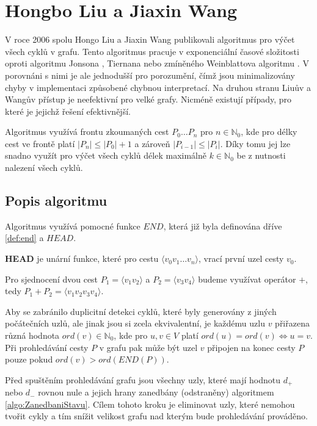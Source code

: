 \chapter{Hongbo Liu a Jiaxin Wang}
    \label{chapter:Algo3}
    V roce 2006 spolu Hongo Liu a Jiaxin Wang publikovali algoritmus \cite{A_new_way_to_enumerate_cycles_in_graph} pro výčet všech cyklů v grafu. Tento algoritmus pracuje v exponenciální časové složitosti oproti algoritmu Jonsona \cite{Johnson_1975}, Tiernana \cite{Tiernan} nebo zmíněného Weinblattova algoritmu \cite{A_new_search_algorithm}. V porovnáni s nimi je ale jednodušší pro porozumění, čímž jsou minimalizovány chyby v implementaci způsobené chybnou interpretací. Na druhou stranu Liuův a Wangův přístup je neefektivní pro velké grafy. Nicméně existují případy, pro které je jejichž řešení efektivnější.

    Algoritmus využívá frontu zkoumaných cest $P_0 \dots P_n$ pro $n \in \mathbb{N}_0$, kde pro délky cest ve frontě platí $|P_n| \leq |P_0| + 1$ a zároveň $|P_{i-1}| \leq |P_{i}|$. Díky tomu jej lze snadno využít pro výčet všech cyklů délek maximálně $k \in \mathbb{N}_0$ be z nutnosti nalezení všech cyklů.

    \section{Popis algoritmu}
        Algoritmus využívá pomocné funkce $\mathit{END}$, která již byla definována dříve \ref{def:end} a $\mathit{HEAD}$.

        \begin{definition}
            \textbf{HEAD} je unární funkce, které pro cestu $\langle v_0 v_1 \dots v_n \rangle$, vrací první uzel cesty $v_0$.\\
        \end{definition}

        Pro sjednocení dvou cest $P_1 = \langle v_1v_2 \rangle$ a $P_2 = \langle v_3v_4 \rangle$ budeme využívat operátor $+$, tedy $P_1 + P_2 = \langle v_1v_2v_3v_4 \rangle$.

        Aby se zabránilo duplicitní detekci cyklů, které byly generovány z jiných počátečních uzlů, ale jinak jsou si zcela ekvivalentní, je každému uzlu $v$ přiřazena různá hodnota $ord(v) \in \mathbb{N}_0$, kde pro $u, v \in V$ platí $ord(u) = ord(v) \iff u = v$. Při prohledávání cesty $P$ v grafu pak může být uzel $v$ připojen na konec cesty $P$ pouze pokud $ord(v) > ord(END(P))$.

        Před spuštěním prohledávání grafu jsou všechny uzly, které mají hodnotu $d_+$ nebo $d_-$ rovnou nule a jejich hrany zanedbány (odstraněny) algoritmem \ref{algo:ZanedbaniStavu}. Cílem tohoto kroku je eliminovat uzly, které nemohou tvořit cykly a tím snížit velikost grafu nad kterým bude prohledávání prováděno.

